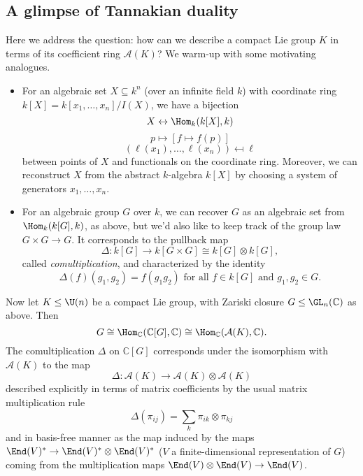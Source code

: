 \documentclass[reqno]{amsart} 
\begin{document}
\subsection{A glimpse of Tannakian duality}
Here we address the question: how can we describe a compact Lie group $K$ in terms of its coefficient ring $\mathcal{A}(K)$?  We warm-up with some motivating analogues.
\begin{itemize}
\item For an algebraic set $X \subseteq k^n$ (over an infinite field $k$) with coordinate ring $k[X] = k[x_1,\dotsc,x_n]/I(X)$, we have a bijection
  \begin{equation*}
    X \leftrightarrow \Hom_k(k[X],k)
  \end{equation*}
  \begin{equation*}
    p \mapsto [f \mapsto f(p)]
  \end{equation*}
  \begin{equation*}
    (\ell(x_1),\dotsc,\ell(x_n)) \mapsfrom \ell
  \end{equation*}
  between points of $X$ and functionals on the coordinate ring.  Moreover, we can reconstruct $X$ from the abstract $k$-algebra $k[X]$ by choosing a system of generators $x_1,\dotsc,x_n$.
\item For an algebraic group $G$ over $k$, we can recover $G$ as an algebraic set from $\Hom_k(k[G],k)$, as above, but we'd also like to keep track of the group law $G \times G \rightarrow G$.  It corresponds to the pullback map
  \begin{equation*}
\Delta : k[G] \rightarrow k[G \times G] \cong k[G] \otimes k[G],
\end{equation*}
  called \emph{comultiplication}, and characterized by the identity
  \begin{equation*}
    \Delta(f)(g_1,g_2) = f(g_1 g_2) \text{ for all } f \in k[G] \text{ and } g_1,g_2 \in G.
  \end{equation*}
\end{itemize}

Now let $K \leq \U(n)$ be a compact Lie group, with Zariski closure $G \leq \GL_n(\mathbb{C})$ as above.  Then
\begin{equation}\label{eq:G-via-tannaka}
  G \cong \Hom_{\mathbb{C}}(\mathbb{C}[G],\mathbb{C}) \cong \Hom_{\mathbb{C}}(\mathcal{A}(K),\mathbb{C}).
\end{equation}
The comultiplication $\Delta$ on $\mathbb{C}[G]$ corresponds under the isomorphism with $\mathcal{A}(K)$ to the map
\begin{equation*}
  \Delta : \mathcal{A}(K) \rightarrow \mathcal{A}(K) \otimes \mathcal{A}(K)
\end{equation*}
described explicitly in terms of matrix coefficients by the usual matrix multiplication rule
\begin{equation*}
  \Delta(\pi_{i j}) = \sum_{k} \pi_{i k} \otimes \pi_{k j}
\end{equation*}
and in basis-free manner as the map induced by the maps $\End(V)^* \rightarrow \End(V)^* \otimes \End(V)^*$ ($V$ a finite-dimensional representation of $G$) coming from the multiplication maps $\End(V) \otimes \End(V) \rightarrow \End(V)$.
\end{document}
